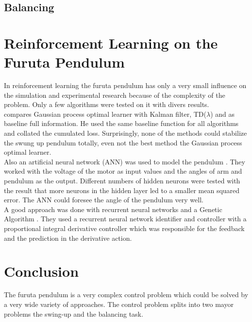 \subsection{Balancing}

\section{Reinforcement Learning on the Furuta Pendulum}
In reinforcement learning the furuta pendulum has only a very small influence 
on the simulation and experimental research because of the complexity of the 
problem. Only a few algorithms were tested on it with divers results.\\
\citeauthor{hennig2011optimal} compares Gaussian process optimal learner with 
Kalman filter, TD($\lambda$) and as baseline full information. He used the same 
baseline function for all algorithms and collated the cumulated loss. 
Surprisingly, none of the methods could stabilize the swung up pendulum 
totally, even not the best method the Gaussian process optimal learner.\\
Also an artificial neural network (ANN) was used to model the pendulum 
\cite{quyen2012rotary}. They worked with the voltage of the motor as input 
values and the angles of arm and pendulum as the output. Different numbers of 
hidden neurons were tested with the result that more neurons in the hidden 
layer led to a smaller mean squared error. The ANN could foresee the angle of 
the pendulum very well.\\
A good approach was done with recurrent neural networks and a Genetic Algorithm 
\cite{shojaei2011hybrid}. They used a recurrent neural network identifier and 
controller with a proportional integral derivative controller which was 
responsible for the feedback and the prediction in the derivative action.


\section{Conclusion}
The furuta pendulum is a very complex control problem which could be solved by 
a very wide variety of approaches. The control problem splits into two mayor 
problems the swing-up and the balancing task.







